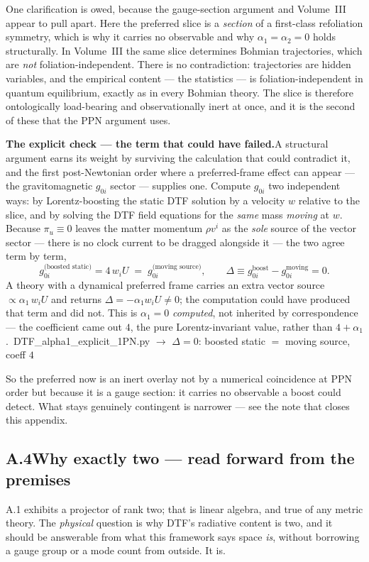\documentclass[11pt]{article}
\newcommand{\pychip}[2]{{\footnotesize\colorbox{cbPyBg}{\ttfamily\,#1\,}\,{\color{gray}$\to$ #2}}}
\begin{document}
\medskip
\noindent One clarification is owed, because the gauge-section argument and Volume~III appear to pull apart.
Here the preferred slice is a \emph{section} of a first-class refoliation symmetry, which is why it carries
no observable and why $\alpha_1=\alpha_2=0$ holds structurally. In Volume~III the same slice determines
Bohmian trajectories, which are \emph{not} foliation-independent. There is no contradiction: trajectories
are hidden variables, and the empirical content --- the statistics --- is foliation-independent in quantum
equilibrium, exactly as in every Bohmian theory. The slice is therefore ontologically load-bearing and
observationally inert at once, and it is the second of these that the PPN argument uses.

\medskip
\noindent\textbf{The explicit check --- the term that could have failed.}\enspace A structural argument
earns its weight by surviving the calculation that could contradict it, and the first post-Newtonian order
where a preferred-frame effect can appear --- the gravitomagnetic $g_{0i}$ sector --- supplies one.
Compute $g_{0i}$ two independent ways: by Lorentz-boosting the static DTF solution by a velocity $w$
relative to the slice, and by solving the DTF field equations for the \emph{same} mass \emph{moving} at
$w$. Because $\pi_u\equiv0$ leaves the matter momentum $\rho v^i$ as the \emph{sole} source of the vector
sector --- there is no clock current to be dragged alongside it --- the two agree term by term,
\[
  g_{0i}^{\text{(boosted static)}}=4\,w_i U \;=\; g_{0i}^{\text{(moving source)}},
  \qquad \Delta \equiv g_{0i}^{\text{boost}}-g_{0i}^{\text{moving}}=0 .
\]
A theory with a dynamical preferred frame carries an extra vector source $\propto\alpha_1\,w_iU$ and returns
$\Delta=-\alpha_1 w_i U\neq0$; the computation could have produced that term and did not. This is
$\alpha_1=0$ \emph{computed}, not inherited by correspondence --- the coefficient came out $4$, the pure
Lorentz-invariant value, rather than $4+\alpha_1$.
\pychip{DTF\_alpha1\_explicit\_1PN.py}{$\Delta=0$: boosted static $=$ moving source, coeff $4$}

\noindent So the preferred now is an inert overlay not by a numerical coincidence at PPN order but because
it is a gauge section: it carries no observable a boost could detect. What stays genuinely contingent is
narrower --- see the note that closes this appendix.

\subsection*{A.4\quad Why exactly two --- read forward from the premises}
A.1 exhibits a projector of rank two; that is linear algebra, and true of any metric theory. The
\emph{physical} question is why DTF's radiative content is two, and it should be answerable from what this
framework says space \emph{is}, without borrowing a gauge group or a mode count from outside. It is.
\end{document}
